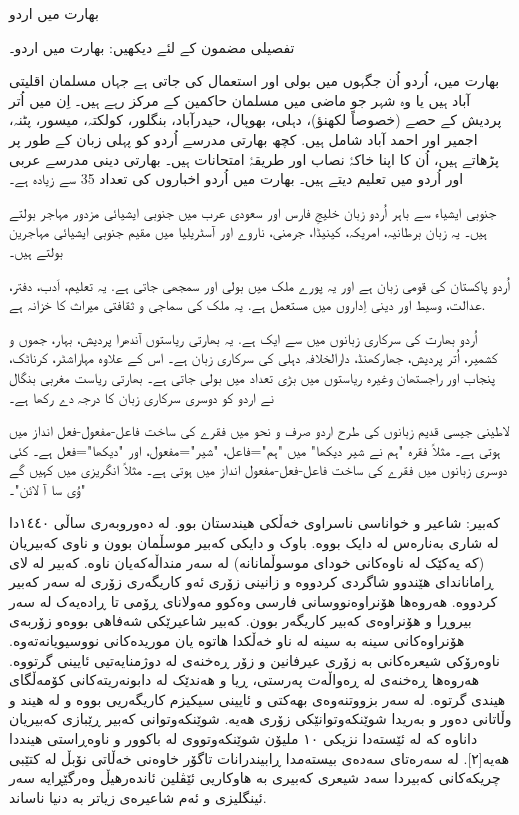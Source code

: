 \documentclass[a4paper]{article}
\begin{document}
\begin{flushright}
بھارت میں اردو

تفصیلی مضمون کے لئے دیکھیں: بھارت میں اردو۔

بھارت میں، اُردو اُن جگہوں میں بولی اور استعمال کی جاتی ہے جہاں مسلمان اقلیتی آباد ہیں یا وہ شہر جو ماضی میں مسلمان حاکمین کے مرکز رہے ہیں۔ اِن میں اُتر پردیش کے حصے (خصوصاً لکھنؤ)، دہلی، بھوپال، حیدرآباد، بنگلور، کولکتہ، میسور، پٹنہ، اجمیر اور احمد آباد شامل ہیں. کچھ بھارتی مدرسے اُردو کو پہلی زبان کے طور پر پڑھاتے ہیں، اُن کا اپنا خاکۂ نصاب اور طریقۂ امتحانات ہیں۔ بھارتی دینی مدرسے عربی اور اُردو میں تعلیم دیتے ہیں۔ بھارت میں اُردو اخباروں کی تعداد 35 سے زیادہ ہے۔

جنوبی ایشیاء سے باہر اُردو زبان خلیجِ فارس اور سعودی عرب میں جنوبی ایشیائی مزدور مہاجر بولتے ہیں۔ یہ زبان برطانیہ، امریکہ، کینیڈا، جرمنی، ناروے اور آسٹریلیا میں مقیم جنوبی ایشیائی مہاجرین بولتے ہیں۔

اُردو پاکستان کی قومی زبان ہے اور یہ پورے ملک میں بولی اور سمجھی جاتی ہے. یہ تعلیم، اَدب، دفتر، عدالت، وسیط اور دینی اِداروں میں مستعمل ہے. یہ ملک کی سماجی و ثقافتی میراث کا خزانہ ہے.

اُردو بھارت کی سرکاری زبانوں میں سے ایک ہے. یہ بھارتی ریاستوں آندھرا پردیش، بہار، جموں و کشمیر، اُتر پردیش، جھارکھنڈ، دارالخلافہ دہلی کی سرکاری زبان ہے۔ اس کے علاوہ مہاراشٹر، کرناٹک، پنجاب اور راجستھان وغیرہ ریاستوں میں بڑی تعداد میں بولی جاتی ہے۔ بھارتی ریاست مغربی بنگال نے اردو کو دوسری سرکاری زبان کا درجہ دے رکھا ہے۔

لاطینی جیسی قدیم زبانوں کی طرح اردو صرف و نحو میں فقرے کی ساخت فاعل-مفعول-فعل انداز میں ہوتی ہے۔ مثلاً فقرہ "ہم نے شیر دیکھا" میں "ہم"=فاعل، "شیر"=مفعول، اور "دیکھا"=فعل ہے۔ کئی دوسری زبانوں میں فقرے کی ساخت فاعل-فعل-مفعول انداز میں ہوتی ہے۔ مثلاً انگریزی میں کہیں گے "وُی سا آ لائن"۔

کەبیر: شاعیر و خواناسی ناسراوی خەڵکی ھیندستان بوو. لە دەوروبەری ساڵی ١٤٤٠دا لە شاری بەنارەس لە دایک بووە. باوک و دایکی کەبیر موسڵمان بوون و ناوی کەبیریان (کە یەکێک لە ناوەکانی خودای موسوڵمانانە) لە سەر منداڵەکەیان ناوە. کەبیر لە لای ڕاماناندای ھێندوو شاگردی کردووە و زانینی زۆری ئەو کاریگەری زۆری لە سەر کەبیر کردووە. ھەروەھا ھۆنراوەنووسانی فارسی وەکوو مەولانای ڕۆمی تا ڕادەیەک لە سەر بیروڕا و ھۆنراوەی کەبیر کاریگەر بوون. کەبیر شاعیرێکی شەفاھی بووەو زۆربەی ھۆنراوەکانی سینە بە سینە لە ناو خەڵکدا ھاتوە یان موریدەکانی نووسیویانەتەوە. ناوەرۆکی شیعرەکانی بە زۆری عیرفانین و زۆر ڕەخنەی لە دوژمنایەتیی ئایینی گرتووە. ھەروەھا ڕەخنەی لە ڕەواڵەت پەرستی، ڕیا و ھەندێک لە دابونەریتەکانی کۆمەڵگای ھیندی گرتوە. لە سەر بزووتنەوەی بھەکتی و ئایینی سیکیزم کاریگەریی بووە و لە ھیند و وڵاتانی دەور و بەریدا شوێنکەوتوانێکی زۆری ھەیە. شوێنکەوتوانی کەبیر ڕێبازی کەبیریان داناوە کە لە ئێستەدا نزیکی ١٠ ملیۆن شوێنکەوتووی لە باکوور و ناوەڕاستی ھینددا ھەیە[٢]. لە سەرەتای سەدەی بیستەمدا ڕابیندرانات تاگۆر خاوەنی خەڵاتی نۆبڵ لە کتێبی چریکەکانی کەبیردا سەد شیعری کەبیری بە ھاوکاریی ئێڤلین ئاندەرھیڵ وەرگێڕایە سەر ئینگلیزی و ئەم شاعیرەی زیاتر بە دنیا ناساند.


\end{flushright}
\end{document}
